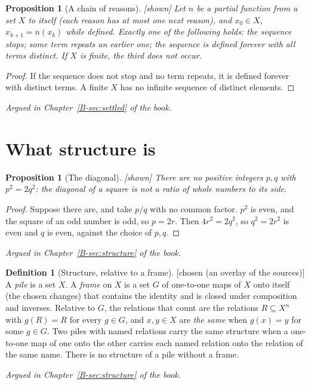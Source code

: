 \documentclass[11pt, a4paper]{article}
\theoremstyle{plain}
\newtheorem{proposition}[theorem]{Proposition}
\theoremstyle{definition}
\newtheorem{definition}[theorem]{Definition}
\theoremstyle{remark}
\newcommand{\argued}[1]{\par\noindent\textit{Argued in Chapter~\ref{B-#1} of the book.}\par}
\newcommand{\kind}[1]{\textup{[#1]}}
\begin{document}
\begin{proposition}[A chain of reasons]\label{spec:chain} \kind{shown}
Let $n$ be a partial function from a set $X$ to itself (each reason has at most one next reason), and
$x_0\in X$, $x_{k+1}=n(x_k)$ while defined. Exactly one of the following holds: the sequence stops; some term
repeats an earlier one; the sequence is defined forever with all terms distinct. If $X$ is finite, the third
does not occur.
\end{proposition}
\begin{proof}
If the sequence does not stop and no term repeats, it is defined forever with distinct terms. A finite $X$
has no infinite sequence of distinct elements.
\end{proof}
\argued{sec:settled}

\section{What structure is}\label{spec:ch10}

\begin{proposition}[The diagonal]\label{spec:diagonal} \kind{shown}
There are no positive integers $p,q$ with $p^2=2q^2$: the diagonal of a square is not a ratio of whole
numbers to its side.
\end{proposition}
\begin{proof}
Suppose there are, and take $p/q$ with no common factor. $p^2$ is even, and the square of an odd number is
odd, so $p=2r$. Then $4r^2=2q^2$, so $q^2=2r^2$ is even and $q$ is even, against the choice of $p,q$.
\end{proof}
\argued{sec:structure}

\begin{definition}[Structure, relative to a frame]\label{spec:structure-def}
\kind{chosen (an overlay of the sources)}
A \emph{pile} is a set $X$. A \emph{frame} on $X$ is a set $G$ of one-to-one maps of $X$ onto itself (the
chosen changes) that contains the identity and is closed under composition and inverses. Relative to $G$,
the relations that count are the relations $R\subseteq X^n$ with $g(R)=R$ for every $g\in G$, and $x,y\in X$
are \emph{the same} when $g(x)=y$ for some $g\in G$. Two piles with named relations carry the same structure
when a one-to-one map of one onto the other carries each named relation onto the relation of the same name.
There is no structure of a pile without a frame.
\end{definition}
\argued{sec:structure}
\end{document}
